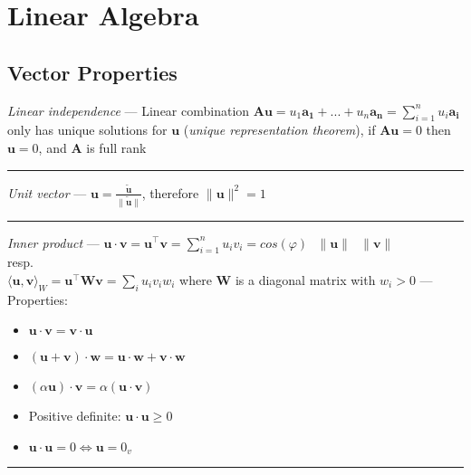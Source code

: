 \section{Linear Algebra}
\subsection*{Vector Properties}
\emph{Linear independence} --- Linear combination $\boldsymbol{A}\boldsymbol{u} = u_1 \boldsymbol{a_1} + ... + u_n \boldsymbol{a_n} = \sum_{i=1}^n u_i \boldsymbol{a_i}$ only has unique solutions for $\boldsymbol{u}$ (\emph{unique representation theorem}), if $\boldsymbol{A}\boldsymbol{u}=0$ then  $\boldsymbol{u}=0$, and $\boldsymbol{A}$ is full rank

{\color{lightgray}\hrule height 0.001mm}

\emph{Unit vector} --- $\boldsymbol{u} = \frac{\boldsymbol{\tilde{u}}}{\|\boldsymbol{\tilde{u}}\|}$, therefore $\|\boldsymbol{u}\|^2 = 1$

{\color{lightgray}\hrule height 0.001mm}

\emph{Inner product} --- $\boldsymbol{u} \cdot \boldsymbol{v} = \boldsymbol{u}^\intercal\boldsymbol{v} = \sum_{i=1}^n u_i v_i = cos(\varphi) \textrm{ } \|\boldsymbol{u}\| \textrm{ } 
 \|\boldsymbol{v}\|$ \\
resp.\\
$\langle \boldsymbol{u}, \boldsymbol{v} \rangle_W = \boldsymbol{u}^\intercal \boldsymbol{W} \boldsymbol{v} = \sum_i u_i v_i w_i $ where $\boldsymbol{W}$ is a diagonal matrix with $w_i > 0$ --- 
Properties:
\begin{multicols}{2}
\begin{itemize}
    \item $\boldsymbol{u} \cdot \boldsymbol{v} = \boldsymbol{v} \cdot \boldsymbol{u}$
    \item $(\boldsymbol{u}+\boldsymbol{v}) \cdot \boldsymbol{w} = \boldsymbol{u} \cdot \boldsymbol{w} + \boldsymbol{v} \cdot \boldsymbol{w}$
    \item $(\alpha\boldsymbol{u}) \cdot \boldsymbol{v} = \alpha (\boldsymbol{u} \cdot \boldsymbol{v})$
    \item Positive definite: $\boldsymbol{u} \cdot \boldsymbol{u} \geq 0$
    \item $\boldsymbol{u} \cdot \boldsymbol{u} = 0 \Leftrightarrow \boldsymbol{u} = 0_v$
\end{itemize}
\end{multicols}

{\color{lightgray}\hrule height 0.001mm}

